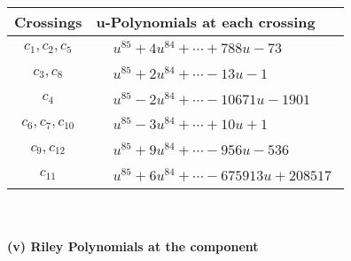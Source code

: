 \documentclass[1p]{elsarticle_modified}
\theoremstyle{definition}
\begin{document}
\begin{tabular}{m{50pt}|m{274pt}}
Crossings & \hspace{64pt}u-Polynomials at each crossing \\
\hline $$\begin{aligned}c_{1},c_{2},c_{5}\end{aligned}$$&$\begin{aligned}
&u^{85}+4 u^{84}+\cdots+788 u-73
\end{aligned}$\\
\hline $$\begin{aligned}c_{3},c_{8}\end{aligned}$$&$\begin{aligned}
&u^{85}+2 u^{84}+\cdots-13 u-1
\end{aligned}$\\
\hline $$\begin{aligned}c_{4}\end{aligned}$$&$\begin{aligned}
&u^{85}-2 u^{84}+\cdots-10671 u-1901
\end{aligned}$\\
\hline $$\begin{aligned}c_{6},c_{7},c_{10}\end{aligned}$$&$\begin{aligned}
&u^{85}-3 u^{84}+\cdots+10 u+1
\end{aligned}$\\
\hline $$\begin{aligned}c_{9},c_{12}\end{aligned}$$&$\begin{aligned}
&u^{85}+9 u^{84}+\cdots-956 u-536
\end{aligned}$\\
\hline $$\begin{aligned}c_{11}\end{aligned}$$&$\begin{aligned}
&u^{85}+6 u^{84}+\cdots-675913 u+208517
\end{aligned}$\\
\hline
\end{tabular}\\~\\
\newpage\renewcommand{\arraystretch}{1}
\flushleft \textbf{(v) Riley Polynomials at the component}\newline \\
\end{document}
